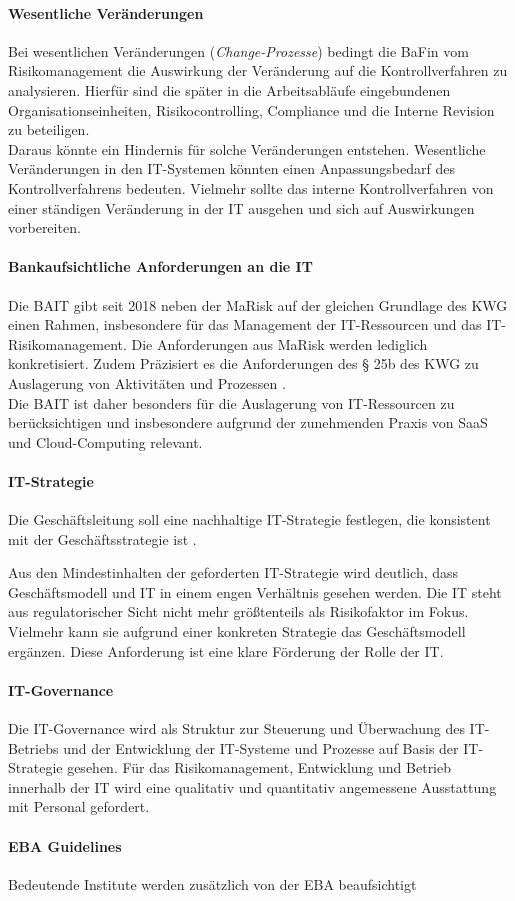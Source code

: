 \paragraph{Wesentliche Veränderungen}
Bei wesentlichen Veränderungen (\emph{Change-Prozesse}) bedingt die \ac{BaFin} \cite{MaRisk:2017} vom Risikomanagement die Auswirkung der Veränderung auf die Kontrollverfahren zu analysieren. Hierfür sind die später in die Arbeitsabläufe eingebundenen Organisationseinheiten, Risikocontrolling, Compliance und die Interne Revision zu beteiligen. 
\medskip
\\
Daraus könnte ein Hindernis für solche Veränderungen entstehen. Wesentliche Veränderungen in den IT-Systemen könnten einen Anpassungsbedarf des Kontrollverfahrens bedeuten. Vielmehr sollte das interne Kontrollverfahren von einer ständigen Veränderung in der IT ausgehen und sich auf Auswirkungen vorbereiten.

\paragraph{Bankaufsichtliche Anforderungen an die IT}
Die \ac{BAIT} gibt seit 2018 neben der \ac{MaRisk} auf der gleichen Grundlage des \ac{KWG} einen  Rahmen, insbesondere für das Management der IT-Ressourcen und das IT-Risikomanagement. Die Anforderungen aus \ac{MaRisk} werden lediglich konkretisiert. Zudem Präzisiert es die Anforderungen des § 25b des
\ac{KWG} zu Auslagerung von Aktivitäten und Prozessen \cite{BAIT:2018}.
\\
Die \ac{BAIT} ist daher besonders für die Auslagerung von IT-Ressourcen zu berücksichtigen und insbesondere aufgrund der zunehmenden Praxis von \ac{SaaS} und Cloud-Computing relevant.

\paragraph{IT-Strategie} Die Geschäftsleitung soll eine nachhaltige IT-Strategie festlegen, die konsistent mit der Geschäftsstrategie ist \cite{BAIT:2018}. 

Aus den Mindestinhalten der geforderten IT-Strategie wird deutlich, dass Geschäftsmodell und IT in einem engen Verhältnis gesehen werden. Die IT steht aus regulatorischer Sicht nicht mehr größtenteils als Risikofaktor im Fokus. Vielmehr kann sie aufgrund einer konkreten Strategie das Geschäftsmodell ergänzen. Diese Anforderung ist eine klare Förderung der Rolle der IT. 

\paragraph{IT-Governance} Die IT-Governance wird als Struktur zur Steuerung und Überwachung des IT-Betriebs und der Entwicklung der IT-Systeme und Prozesse auf Basis der IT-Strategie \cite{BAIT:2018} gesehen. Für das Risikomanagement, Entwicklung und Betrieb innerhalb der IT wird eine qualitativ und quantitativ angemessene Ausstattung mit Personal gefordert.

\paragraph{EBA Guidelines}
Bedeutende Institute werden zusätzlich von der \ac{EBA} beaufsichtigt \cite{recht/Bornemann2018}
